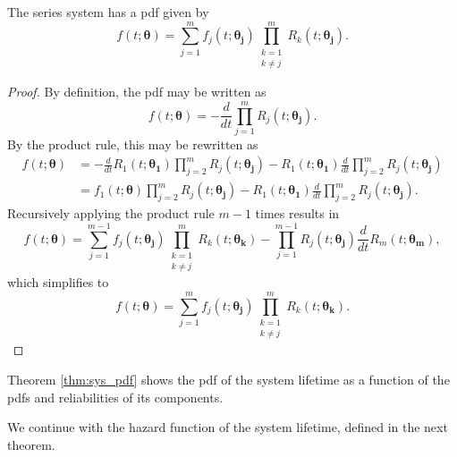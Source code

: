 \documentclass[
]{article}
\begin{document}
\begin{theorem}
\label{thm:sys_pdf}
The series system has a pdf given by
\begin{equation}
\label{eq:sys_pdf}
f(t;\boldsymbol{\theta}) = \sum_{j=1}^m f_j(t;\boldsymbol{\theta_j})
    \prod_{\substack{k=1\\k\neq j}}^m R_k(t;\boldsymbol{\theta_j}).
\end{equation}
\end{theorem}
\begin{proof}
By definition, the pdf may be written as
$$
    f(t;\boldsymbol{\theta}) = -\frac{d}{dt} \prod_{j=1}^m R_j(t;\boldsymbol{\theta_j}).
$$
By the product rule, this may be rewritten as
\begin{align*}
  f(t;\boldsymbol{\theta})
    &= -\frac{d}{dt} R_1(t;\boldsymbol{\theta_1})\prod_{j=2}^m R_j(t;\boldsymbol{\theta_j}) -
      R_1(t;\boldsymbol{\theta_1}) \frac{d}{dt} \prod_{j=2}^m R_j(t;\boldsymbol{\theta_j})\\
    &= f_1(t;\boldsymbol{\theta}) \prod_{j=2}^m R_j(t;\boldsymbol{\theta_j}) -
      R_1(t;\boldsymbol{\theta_1}) \frac{d}{dt} \prod_{j=2}^m R_j(t;\boldsymbol{\theta_j}).
\end{align*}
Recursively applying the product rule $m-1$ times results in
$$
f(t;\boldsymbol{\theta}) = \sum_{j=1}^{m-1} f_j(t;\boldsymbol{\theta_j})
    \prod_{\substack{k=1\\k \neq j}}^m R_k(t;\boldsymbol{\theta_k}) -
    \prod_{j=1}^{m-1} R_j(t;\boldsymbol{\theta_j}) \frac{d}{dt} R_m(t;\boldsymbol{\theta_m}),
$$
which simplifies to
$$
f(t;\boldsymbol{\theta})= \sum_{j=1}^m f_j(t;\boldsymbol{\theta_j})
    \prod_{\substack{k=1\\k \neq j}}^m R_k(t;\boldsymbol{\theta_k}).
$$
\end{proof}

Theorem \ref{thm:sys_pdf} shows the pdf of the system lifetime as a
function of the pdfs and reliabilities of its components.

We continue with the hazard function of the system lifetime, defined in
the next theorem.
\end{document}

